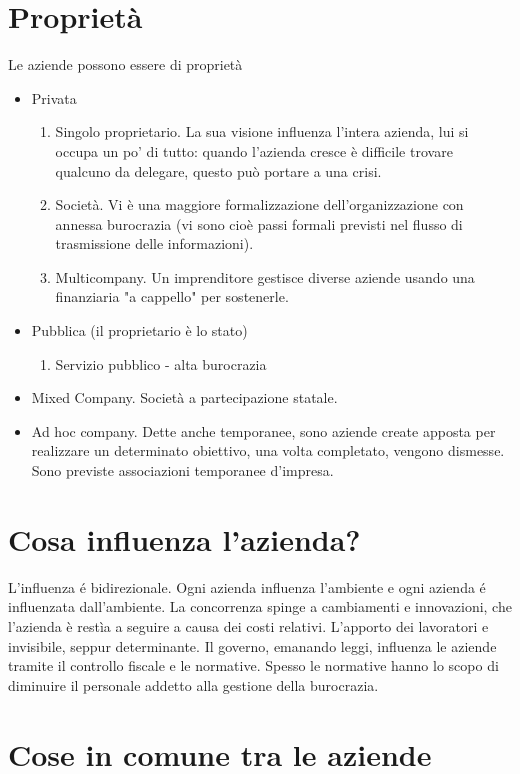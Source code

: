 \section{Propriet\`a}
Le aziende possono essere di propriet\`a
\begin{itemize}
\item Privata
\begin{enumerate}
\item Singolo proprietario. La sua visione influenza l'intera azienda, lui si occupa un po' di tutto: quando l'azienda cresce \`e difficile trovare qualcuno da delegare, questo pu\`o portare a una crisi.
\item Societ\`a. Vi \`e una maggiore formalizzazione dell'organizzazione con annessa burocrazia (vi sono cio\`e passi formali previsti nel flusso di trasmissione delle informazioni).
\item Multicompany. Un imprenditore gestisce diverse aziende usando una finanziaria "a cappello" per sostenerle.
\end{enumerate}
\item Pubblica (il proprietario \`e lo stato)
\begin{enumerate}
	\item Servizio pubblico - alta burocrazia
\end{enumerate}
\item Mixed Company. Societ\`a a partecipazione statale.
\item Ad hoc company. Dette anche temporanee, sono aziende create apposta per realizzare un determinato obiettivo, una volta completato, vengono dismesse. Sono previste associazioni temporanee d'impresa.
\end{itemize}

\section{Cosa influenza l'azienda?}
L'influenza \'e bidirezionale. Ogni azienda influenza l'ambiente e ogni azienda \'e influenzata dall'ambiente.
La concorrenza spinge a cambiamenti e innovazioni, che l'azienda \`e rest\`ia a seguire a causa dei costi relativi.
L'apporto dei lavoratori e invisibile, seppur determinante.
Il governo, emanando leggi, influenza le aziende tramite il controllo fiscale e le normative. Spesso le normative hanno lo scopo di diminuire il personale addetto alla gestione della burocrazia.
\section{Cose in comune tra le aziende}
